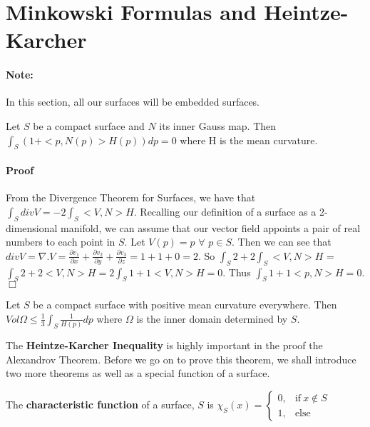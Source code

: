 \documentclass[a4paper,12pt]{report}
\begin{document}
\section{Minkowski Formulas and Heintze-Karcher}

\paragraph{Note:} In this section, all our surfaces will be embedded surfaces.

\begin{theorem}
Let $S$ be a compact surface and $N$ its inner Gauss map. Then $\int_{S} (1+ <p,N(p)>H(p)) dp = 0$ where H is the mean curvature.
\end{theorem}

\paragraph{Proof} From the Divergence Theorem for Surfaces, we have that $\int_{S} div V = -2\int_{S} <V,N>H$. Recalling our definition of a surface as a 2-dimensional manifold, we can assume that our vector field appoints a pair of real numbers to each point in $S$. Let $V(p) = p$ $\forall$  $p  \in S$. Then we can see that $div V = \nabla . V = \frac{\partial v_{1}}{\partial x} + \frac{\partial v_{2}}{\partial y} + \frac{\partial v_{3}}{\partial z} = 1 + 1 + 0 = 2$. So $\int_{S} 2 + 2\int_{S} <V,N>H$ = $\int_{S} 2 + 2<V,N>H = 2\int_{S} 1 + 1<V,N>H = 0 $. Thus $\int_{S} 1 + 1<p,N>H = 0$. \hfill $\Box$
 
\begin{theorem}
Let $S$ be a compact surface with positive mean curvature everywhere. Then $Vol\Omega \leq \frac{1}{3} \int_{S} \frac{1}{H(p)}dp$ where $\Omega$ is the inner domain determined by $S$.
\end{theorem}

The \textbf{Heintze-Karcher Inequality} is highly important in the proof the Alexandrov Theorem. Before we go on to prove this theorem, we shall introduce two more theorems as well as a special function of a surface.

\begin{definition}
The \textbf{characteristic function} of a surface, $S$ is $\chi_{S}(x) =    
\begin{cases}
      0, & \text{if}\ x \notin S \\
      1, & \text{else}
\end{cases}$
\end{definition}
\end{document}

